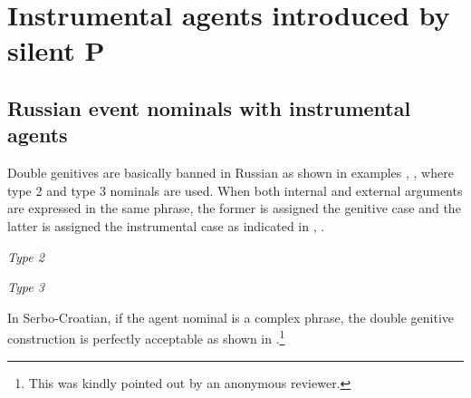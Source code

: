 \documentclass[output=paper,
]{langscibook}
\begin{document}
\section{Instrumental agents introduced by silent P}\label{sec:INS}

\subsection{Russian event nominals with instrumental agents}


Double genitives are basically banned in Russian as shown in examples , , where type 2 and type 3 nominals are used.
When both internal and external arguments are expressed in the same phrase, the former is assigned the genitive case and the latter is assigned the instrumental case as indicated in , .

\begin{exe}
\ex\label{ispG} \textit{Type 2}
\begin{xlist}
 \hfill\citep[162]{Ljutikova2016}
\end{xlist}
\end{exe}

\begin{exe}
\ex\label{razG} \textit{Type 3}
\begin{xlist}

{}
\end{xlist}
\end{exe}

\noindent In Serbo-Croatian, if the agent nominal is a complex phrase, the double genitive construction is perfectly acceptable as shown in .\footnote{
			This was kindly pointed out by an anonymous reviewer.}
\end{document}
